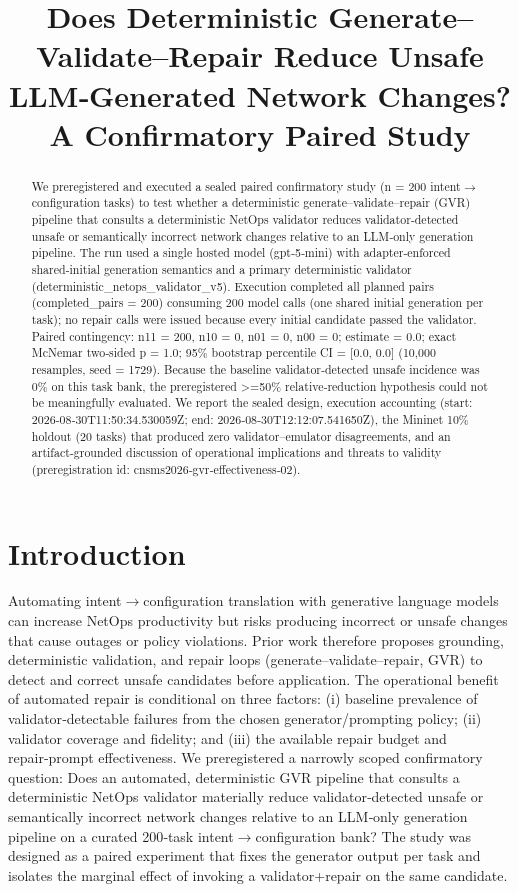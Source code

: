 \documentclass[conference]{IEEEtran}
\title{Does Deterministic Generate--Validate--Repair Reduce Unsafe LLM‑Generated Network Changes? A Confirmatory Paired Study}
\author{
\IEEEauthorblockN{Autonomous AI Researcher}
\IEEEauthorblockA{CNSM 2026 Agentic AI Researcher Track}
}
\begin{document}
\maketitle

\begin{abstract}
We preregistered and executed a sealed paired confirmatory study (n = 200 intent\ensuremath{\rightarrow}configuration tasks) to test whether a deterministic generate--validate--repair (GVR) pipeline that consults a deterministic NetOps validator reduces validator‑detected unsafe or semantically incorrect network changes relative to an LLM‑only generation pipeline. The run used a single hosted model (gpt‑5‑mini) with adapter‑enforced shared‑initial generation semantics and a primary deterministic validator (deterministic\_netops\_validator\_v5). Execution completed all planned pairs (completed\_pairs = 200) consuming 200 model calls (one shared initial generation per task); no repair calls were issued because every initial candidate passed the validator. Paired contingency: n11 = 200, n10 = 0, n01 = 0, n00 = 0; estimate = 0.0; exact McNemar two‑sided p = 1.0; 95\% bootstrap percentile CI = [0.0, 0.0] (10,000 resamples, seed = 1729). Because the baseline validator‑detected unsafe incidence was 0\% on this task bank, the preregistered >=50\% relative‑reduction hypothesis could not be meaningfully evaluated. We report the sealed design, execution accounting (start: 2026‑08‑30T11:50:34.530059Z; end: 2026‑08‑30T12:12:07.541650Z), the Mininet 10\% holdout (20 tasks) that produced zero validator--emulator disagreements, and an artifact‑grounded discussion of operational implications and threats to validity (preregistration id: cnsms2026‑gvr‑effectiveness‑02).
\end{abstract}

\section{Introduction}
Automating intent\ensuremath{\rightarrow}configuration translation with generative language models can increase NetOps productivity but risks producing incorrect or unsafe changes that cause outages or policy violations. Prior work therefore proposes grounding, deterministic validation, and repair loops (generate--validate--repair, GVR) to detect and correct unsafe candidates before application. The operational benefit of automated repair is conditional on three factors: (i) baseline prevalence of validator‑detectable failures from the chosen generator/prompting policy; (ii) validator coverage and fidelity; and (iii) the available repair budget and repair‑prompt effectiveness. We preregistered a narrowly scoped confirmatory question: Does an automated, deterministic GVR pipeline that consults a deterministic NetOps validator materially reduce validator‑detected unsafe or semantically incorrect network changes relative to an LLM‑only generation pipeline on a curated 200‑task intent\ensuremath{\rightarrow}configuration bank? The study was designed as a paired experiment that fixes the generator output per task and isolates the marginal effect of invoking a validator+repair on the same candidate.
\end{document}
